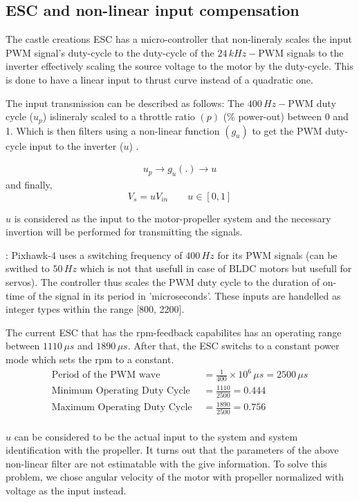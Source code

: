 \subsection{ESC and non-linear input compensation}

The castle creations ESC has a micro-controller that non-lineraly scales the input PWM signal's duty-cycle to the duty-cycle of the $24\,kHz -$PWM signals to the inverter effectively scaling the source voltage to the motor by the duty-cycle. This is done to have a linear input to thrust curve instead of a quadratic one.

The input transmission can be described as follows: The $400\,Hz-$PWM duty cycle ($u_p$) islineraly scaled to a throttle ratio $(p)$ ($\%$ power-out) between 0 and 1. Which is then filters using a non-linear function $(g_u)$ to get the PWM duty-cycle input to the inverter ($u$) \cite{kim2017electric}.

\begin{align*}
    u_p \rightarrow \boxed{g_u(.)} \rightarrow u
\end{align*}
and finally,
$$V_s = u V_{in} \qquad u \in [0, 1]$$

$u$ is considered as the input to the motor-propeller system and the necessary invertion will be performed for transmitting the signals.

:
Pixhawk-4 uses a switching frequency of $400\,Hz$ for its PWM signals (can be swithed to $50 \, Hz$ which is not that usefull in case of BLDC motors but usefull for servos). The controller thus scales the PWM duty cycle to the duration of on-time of the signal in its period in 'microseconds'. These inputs are handelled as integer types within the range [800, 2200]\cite{px4_pwm}.

The current ESC that has the rpm-feedback capabilites has an operating range between $1110 \, \mu s$ and $1890 \, \mu s$. After that, the ESC switchs to a constant power mode which sets the rpm to a constant.
\begin{align*}
    \text{Period of the PWM wave } &= \frac{1}{400} \times 10^6 \, \mu s = 2500 \, \mu s\\
    \text{Minimum Operating Duty Cycle } &= \frac{1110}{2500} = 0.444\\
    \text{Maximum Operating Duty Cycle } &= \frac{1890}{2500} = 0.756\\
\end{align*}

$u$ can be considered to be the actual input to the system and system identification with the propeller. It turns out that the parameters of the above non-linear filter are not estimatable with the give information. To solve this problem, we chose angular velocity of the motor with propeller normalized with voltage as the input instead.
